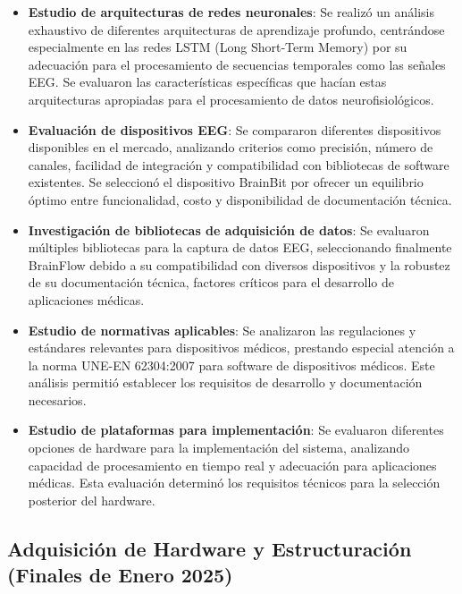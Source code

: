 \begin{itemize}
    \item \textbf{Estudio de arquitecturas de redes neuronales}: Se realizó un análisis exhaustivo de diferentes arquitecturas de aprendizaje profundo, centrándose especialmente en las redes LSTM (Long Short-Term Memory) por su adecuación para el procesamiento de secuencias temporales como las señales EEG. Se evaluaron las características específicas que hacían estas arquitecturas apropiadas para el procesamiento de datos neurofisiológicos.
    
    \item \textbf{Evaluación de dispositivos EEG}: Se compararon diferentes dispositivos disponibles en el mercado, analizando criterios como precisión, número de canales, facilidad de integración y compatibilidad con bibliotecas de software existentes. Se seleccionó el dispositivo BrainBit por ofrecer un equilibrio óptimo entre funcionalidad, costo y disponibilidad de documentación técnica.
    
    \item \textbf{Investigación de bibliotecas de adquisición de datos}: Se evaluaron múltiples bibliotecas para la captura de datos EEG, seleccionando finalmente BrainFlow debido a su compatibilidad con diversos dispositivos y la robustez de su documentación técnica, factores críticos para el desarrollo de aplicaciones médicas.
    
    \item \textbf{Estudio de normativas aplicables}: Se analizaron las regulaciones y estándares relevantes para dispositivos médicos, prestando especial atención a la norma UNE-EN 62304:2007 para software de dispositivos médicos. Este análisis permitió establecer los requisitos de desarrollo y documentación necesarios.
    
    \item \textbf{Estudio de plataformas para implementación}: Se evaluaron diferentes opciones de hardware para la implementación del sistema, analizando capacidad de procesamiento en tiempo real y adecuación para aplicaciones médicas. Esta evaluación determinó los requisitos técnicos para la selección posterior del hardware.
\end{itemize}

\subsection{Adquisición de Hardware y Estructuración (Finales de Enero 2025)}

